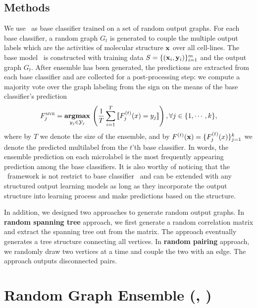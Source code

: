 {%
%
\subsection{Methods}

We use \mmcrf\ as base classifier trained on a set of random output graphs.
For each base classifier, a random graph $G_t$ is generated to couple the multiple output labels which are the activities of molecular structure $\mathbf {x}$ over all cell-lines.
The base model \mmcrf\ is constructed with training data $S=\{(\mathbf {x}_i,\mathbf {y}_i)\}_{i=1}^{m}$ and the output graph $G_t$.
After ensemble has been generated, the predictions are extracted from each base classifier and are collected for a post-processing step: we compute a majority vote over the graph labeling from the sign on the means of the base classifier's prediction
\begin{align*}
	F_j^{\text{{\sc mve}}}=\underset{y_j\in\mathcal{Y}_j}{\textbf{argmax}}\,\left(\frac{1}{T}\sum_{i=1}^{T}{\llbracket F_j^{(t)}(x)=y_j \rrbracket}\right), \forall j\in\{1,\cdots,k\},
\end{align*}
where by $T$ we denote the size of the ensemble, and by $F^{(t)}(\mathbf {x})=\{F^{(t)}_j(x)\}_{j=1}^{k}$ we denote the predicted multilabel from the $t$'th base classifier.
In words, the ensemble prediction on each microlabel is the most frequently appearing prediction among the base classifiers.
It is also worthy of noticing that the \mve\ framework is not restrict to base classifier \mmcrf\ and can be extended with any structured output learning models as long as they incorporate the output structure into learning process and make predictions based on the structure.

In addition, we designed two approaches to generate random output graphs.
In \textbf{random spanning tree} approach, we first generate a random correlation matrix and extract the spanning tree out from the matrix.
The approach eventually generates a tree structure connecting all vertices.
In \textbf{random pairing} approach, we randomly draw two vertices at a time and couple the two with an edge.
The approach outputs disconnected pairs.



%
%
\section{Random Graph Ensemble (\amm, \mam)} \label{sc_su14a}

}
